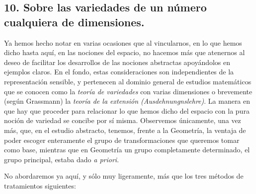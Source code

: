 \documentclass[a4paper, 12pt]{article}
\begin{document}
\subsection*{10. Sobre las variedades de un número cualquiera de dimensiones.}

Ya hemos hecho notar en varias ocasiones que al vincularnos, en lo que hemos dicho hasta aquí, en las nociones del espacio, no hacemos más que atenernos al deseo de facilitar los desarrollos de las nociones abstractas apoyándolos en ejemplos claros. En el fondo, estas consideraciones son independientes de la representación sensible, y pertenecen al dominio general de estudios matemáticos que se conocen como la \textit{teoría de variedades} con varias dimensiones o brevemente (según Grassmann) la \textit{teoría de la extensión (Ausdehnungnslehre)}. La manera en que hay que proceder para relacionar lo que hemos dicho del espacio con la pura noción de variedad se concibe por sí misma. Observemos únicamente, una vez más, que, en el estudio abstracto, tenemos, frente a la Geometría, la ventaja de poder escoger enteramente el grupo de transformaciones que queremos tomar como base, mientras que en Geometría un grupo completamente determinado, el grupo principal, estaba dado \textit{a priori}.

No abordaremos ya aquí, y sólo muy ligeramente, más que los tres mé\-todos de tratamientos siguientes: 
\end{document}

